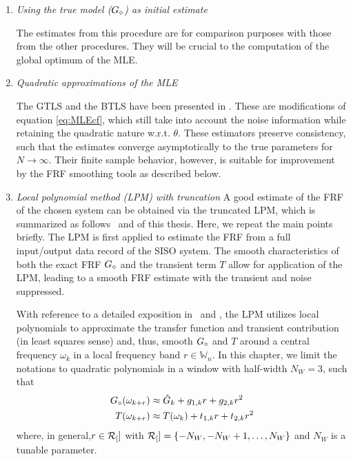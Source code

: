 \begin{enumerate}
\item \emph{Using the true model (${G}_{\circ}$) as initial estimate}

The estimates from this procedure are for comparison purposes with those from the other procedures. They will be crucial to the computation of the global optimum of the \gls{MLE}.

\item \emph{Quadratic approximations of the \gls{MLE}}

The \gls{GTLS} and the \gls{BTLS} have been presented in \citep{Pintelon1998}. 
These are modifications of equation \eqref{eq:MLEcf}, which still take into account the noise information while retaining the quadratic nature w.r.t. $\theta$. 
These estimators preserve consistency, such that the estimates converge asymptotically to the true parameters for $N\to\infty$. 
Their finite sample behavior, however, is suitable for improvement by the \gls{FRF} smoothing tools as described below.

\item \emph{Local polynomial method (LPM) with truncation}
A good estimate of the \gls{FRF} of the chosen system can be obtained via the truncated \gls{LPM}, which is summarized as follows~\citep{Lumori2014TIM} and  of this thesis.
Here, we repeat the main points briefly.
The \gls{LPM} is first applied to estimate the \gls{FRF} from a full input/output data record of the \gls{SISO} system.
The smooth characteristics of both the exact \gls{FRF} ${G}_{\circ}$ and the transient term $T$ allow for application of the \gls{LPM}, leading to a smooth \gls{FRF} estimate with the transient and noise suppressed.

  With reference to a detailed exposition in~\citep{Lumori2014TIM} and , the \gls{LPM} utilizes local polynomials to approximate the transfer function and transient contribution (in least squares sense) and, thus, smooth ${G}_{\circ}$ and $T$ around a central frequency $\omega_{k}$ in a local frequency band $r\in\mathbb{W}_n$.
  In this chapter, we limit the notations to quadratic polynomials in a window with half-width $N_W=3$, such that
\begin{subequations}\label{lpmImplQuadG}
\begin{align}
{G}_{\circ}(\omega_{k+r})&\approx \hat G_k + g_{1,k} r + g_{2,k}r^2
\\
T(\omega_{k+r})&\approx T(\omega_k)+t_{1,k}r + t_{2,k}r^2
\label{lpmImplQuadT}
\end{align}
\end{subequations}
where, in general,$r \in \mathcal{R}_{[}]$ with $\mathcal{R}_{[}] = \{-N_W,-N_W+1,\dots,N_W\}$ and $N_W$ is a tunable parameter. 


\end{enumerate}
